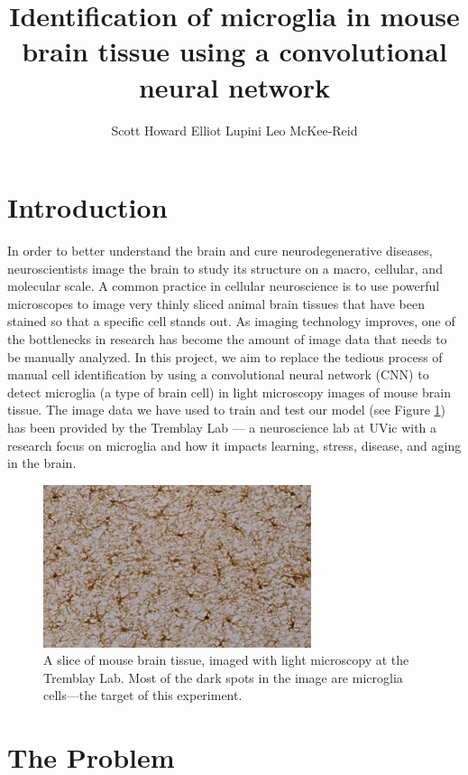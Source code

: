 \documentclass{article}
\title{Identification of microglia in mouse brain tissue using a convolutional 
neural network}
\author{
    Scott Howard
    \And
    Elliot Lupini
    \And
    Leo McKee-Reid
}
\begin{document}
\maketitle

\section{Introduction}

In order to better understand the brain and cure neurodegenerative diseases, 
neuroscientists image the brain to study its structure on a macro, cellular, 
and molecular scale. A common practice in cellular neuroscience is to use 
powerful microscopes to image very thinly sliced animal brain tissues that 
have been stained so that a specific cell stands out. As imaging technology 
improves, one of the bottlenecks in research has become the amount of image 
data that needs to be manually analyzed. In this project, we aim to replace the 
tedious process of manual cell identification by using a convolutional neural 
network (CNN) to detect microglia (a type of brain cell) in light microscopy 
images of mouse brain tissue. The image data we have used to train and test our 
model (see Figure \ref{fig:hippocampus}) has been provided by the Tremblay 
Lab --- a neuroscience lab at UVic with a research focus on microglia and how 
it impacts learning, stress, disease, and aging in the brain\parencite{tremblay}.

\begin{figure}[ht]
  \includegraphics[width=0.7\textwidth]{hippocampus.png}
  \centering
  \caption{A slice of mouse brain tissue, imaged with light microscopy at the 
  Tremblay Lab. Most of the dark spots in the image are microglia cells---the 
  target of this experiment.}
  \label{fig:hippocampus}
\end{figure}

\section{The Problem}
\end{document}
